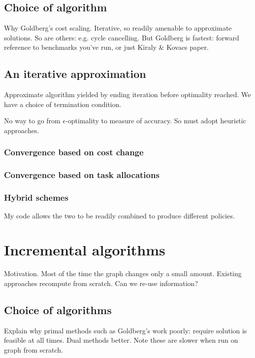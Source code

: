 \subsection{Choice of algorithm} \label{sec:impl-approx-choice}

Why Goldberg's cost scaling. Iterative, so readily amenable to approximate solutions. So are others: e.g. cycle cancelling. But Goldberg is fastest: forward reference to benchmarks you've run, or just Kiraly \& Kovacs paper.

\subsection{An iterative approximation}

Approximate algorithm yielded by ending iteration before optimality reached. We have a choice of termination condition.

No way to go from $\epsilon$-optimality to measure of accuracy. So must adopt heuristic approaches.

\subsubsection{Convergence based on cost change}

\subsubsection{Convergence based on task allocations}

\subsubsection{Hybrid schemes}

My code allows the two to be readily combined to produce different policies.

\section{Incremental algorithms}

Motivation. Most of the time the graph changes only a small amount. Existing approaches recompute from scratch. Can we re-use information?

\subsection{Choice of algorithms}

Explain why primal methods such as Goldberg's work poorly: require solution is feasible at all times. Dual methods better. Note these are slower when run on graph from scratch.

